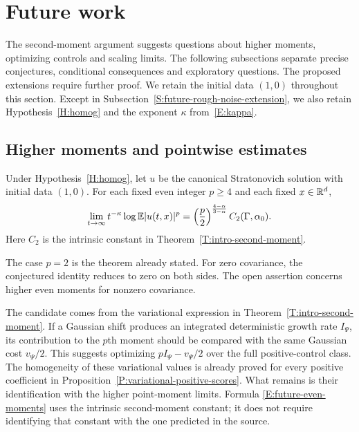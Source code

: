 \section{Future work}\label{S:future-work}

The second-moment argument suggests questions about higher moments, optimizing
controls and scaling limits. The following subsections separate precise
conjectures, conditional consequences and exploratory questions. The proposed
extensions require further proof.
We retain the initial data $(1,0)$ throughout this section. Except in
Subsection~\ref{S:future-rough-noise-extension}, we also retain
Hypothesis~\ref{H:homog} and the exponent $\kappa$ from~\eqref{E:kappa}.

\subsection{Higher moments and pointwise estimates}\label{S:future-higher-moments}
\begin{conjecture}
  \label{Conj:intrinsic-even-moments}
  Under Hypothesis~\ref{H:homog}, let $u$ be the canonical Stratonovich
  solution with initial data $(1,0)$. For each fixed even integer $p \ge 4$
  and each fixed $x \in \mathbb{R}^d$,
  \begin{equation}\label{E:future-even-moments}
    \lim_{t\to\infty}t^{-\kappa}\log\mathbb{E}|u(t,x)|^p
    =\left(\frac{p}{2}\right)^{\frac{4-\alpha}{3-\alpha}}
    C_2(\Gamma,\alpha_0).
  \end{equation}
  Here $C_2$ is the intrinsic constant in
  Theorem~\ref{T:intro-second-moment}.
\end{conjecture}

The case $p = 2$ is the theorem already stated. For zero covariance, the
conjectured identity reduces to zero on both sides. The open assertion concerns
higher even moments for nonzero covariance.

The candidate comes from the variational expression in
Theorem~\ref{T:intro-second-moment}. If a Gaussian shift produces an integrated
deterministic growth rate $I_\Psi$, its contribution to the $p$th moment should
be compared with the same Gaussian cost $v_\Psi/2$. This suggests optimizing
$pI_\Psi-v_\Psi/2$ over the full positive-control class. The homogeneity of
these variational values is already proved for every positive coefficient in
Proposition~\ref{P:variational-positive-scores}. What remains is their
identification with the higher point-moment limits. Formula
\eqref{E:future-even-moments} uses the intrinsic second-moment constant; it does
not require identifying that constant with the one predicted in the source.

